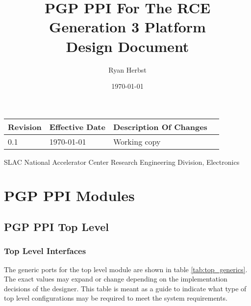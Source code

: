 \documentclass[11pt]{article}
\begin{document}
\thispagestyle{empty}

\title{PGP PPI For The RCE Generation 3 Platform\\Design Document}
\author{Ryan Herbst}
\date{\today}

\maketitle
\begin{table}[H]
\centering
   \begin{tabular}{| l | l | l | l | } 
      \hline \textbf{Revision} & \textbf{Effective Date} & \textbf{Description Of Changes} \\
      \hline 0.1               & \today                  & Working copy \\
      \hline
   \end{tabular}
\end{table}

\vfill
\begin{center}
SLAC National Accelerator Center
Research Engineering Division, Electronics
\end{center}
\newpage
\tableofcontents

\newpage
\listoftables

\newpage
\listoffigures



\newpage
\section{PGP PPI Modules}

\subsection{PGP PPI Top Level}
\label{subsec:pgp_ppi_top}

\subsubsection{Top Level Interfaces}

The generic ports for the top level module are shown in table \ref{tab:top_generics}. 
The exact values may expand or change depending on the implementation decisions  of the
designer. This table is meant as a guide to indicate what type of top level configurations 
may be required to meet the system requirements. 
\end{document}
